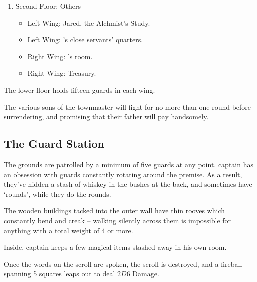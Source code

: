 \begin{multicols}{2}
\begin{enumerate}
	\item{Second Floor: Others}
		\begin{itemize}
			\item{Left Wing: Jared, the Alchmist's Study.}
			\item{Left Wing: 's close servants' quarters.}
			\item{Right Wing: 's room.}
			\item{Right Wing: Treasury.}
		\end{itemize}

\end{enumerate}


The lower floor holds fifteen guards in each wing.

\humansoldier


The various sons of the townmaster will fight for no more than one round before surrendering, and promising that their father will pay handsomely.

\humandiplomat

\label{citadel_alchemist}

\humanalchemist

\subsection{The Guard Station}\label{guardstation}
The grounds are patrolled by a minimum of five guards at any point.
\Gls{captain} has an obsession with guards constantly rotating around the premise.
As a result, they've hidden a stash of whiskey in the bushes at the back, and sometimes have `rounds', while they do the rounds.

The wooden buildings tacked into the outer wall have thin rooves which constantly bend and creak -- walking silently across them is impossible for anything with a total weight of 4 or more.

Inside, \gls{captain} keeps a few magical items stashed away in his own room.


Once the words on the scroll are spoken, the scroll is destroyed, and a fireball spanning 5 squares leaps out to deal $2D6$ Damage.


\end{multicols}
